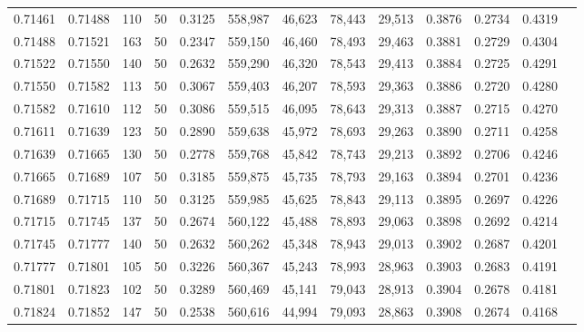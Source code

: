 \begin{tabular}{rrrrrrrrrrrrr}
0.71461 & 0.71488 &   110 &  50 &                                     0.3125 & 558,987 &  46,623 &  78,443 &  29,513 & 0.3876 & 0.2734 & 0.4319 \\
0.71488 & 0.71521 &   163 &  50 &                                     0.2347 & 559,150 &  46,460 &  78,493 &  29,463 & 0.3881 & 0.2729 & 0.4304 \\
0.71522 & 0.71550 &   140 &  50 &                                     0.2632 & 559,290 &  46,320 &  78,543 &  29,413 & 0.3884 & 0.2725 & 0.4291 \\
0.71550 & 0.71582 &   113 &  50 &                                     0.3067 & 559,403 &  46,207 &  78,593 &  29,363 & 0.3886 & 0.2720 & 0.4280 \\
0.71582 & 0.71610 &   112 &  50 &                                     0.3086 & 559,515 &  46,095 &  78,643 &  29,313 & 0.3887 & 0.2715 & 0.4270 \\
0.71611 & 0.71639 &   123 &  50 &                                     0.2890 & 559,638 &  45,972 &  78,693 &  29,263 & 0.3890 & 0.2711 & 0.4258 \\
0.71639 & 0.71665 &   130 &  50 &                                     0.2778 & 559,768 &  45,842 &  78,743 &  29,213 & 0.3892 & 0.2706 & 0.4246 \\
0.71665 & 0.71689 &   107 &  50 &                                     0.3185 & 559,875 &  45,735 &  78,793 &  29,163 & 0.3894 & 0.2701 & 0.4236 \\
0.71689 & 0.71715 &   110 &  50 &                                     0.3125 & 559,985 &  45,625 &  78,843 &  29,113 & 0.3895 & 0.2697 & 0.4226 \\
0.71715 & 0.71745 &   137 &  50 &                                     0.2674 & 560,122 &  45,488 &  78,893 &  29,063 & 0.3898 & 0.2692 & 0.4214 \\
0.71745 & 0.71777 &   140 &  50 &                                     0.2632 & 560,262 &  45,348 &  78,943 &  29,013 & 0.3902 & 0.2687 & 0.4201 \\
0.71777 & 0.71801 &   105 &  50 &                                     0.3226 & 560,367 &  45,243 &  78,993 &  28,963 & 0.3903 & 0.2683 & 0.4191 \\
0.71801 & 0.71823 &   102 &  50 &                                     0.3289 & 560,469 &  45,141 &  79,043 &  28,913 & 0.3904 & 0.2678 & 0.4181 \\
0.71824 & 0.71852 &   147 &  50 &                                     0.2538 & 560,616 &  44,994 &  79,093 &  28,863 & 0.3908 & 0.2674 & 0.4168 \\

\end{tabular}

